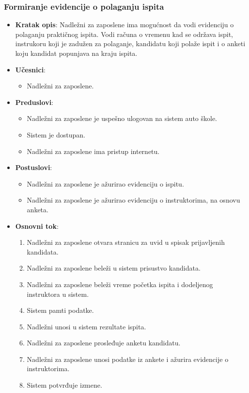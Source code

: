 \subsubsection{Formiranje evidencije o polaganju ispita}
\label{subsubsec:vozni park}
\begin{itemize}
  \item \textbf{Kratak opis}: Nadležni za zaposlene ima mogućnost da vodi evidenciju o polaganju praktičnog ispita. Vodi računa o vremenu kad se održava ispit, instrukoru koji je zadužen za polaganje, kandidatu koji polaže ispit i o anketi koju kandidat popunjava na kraju ispita.

  \item \textbf{Učesnici}:
    \begin{itemize}
    \item Nadležni za zaposlene.
    \end{itemize}
  \item \textbf{Preduslovi}:
    \begin{itemize}
    \item  Nadležni za zaposlene je uspešno ulogovan na sistem auto škole.
    \item  Sistem je dostupan.
    \item  Nadležni za zaposlene ima pristup internetu.
    \end{itemize}
  \item \textbf{Postuslovi}:
      \begin{itemize}
      \item  Nadležni za zaposlene je ažurirao evidenciju o ispitu.
      \item  Nadležni za zaposlene je ažurirao evidenciju o instruktorima, na osnovu anketa.
      \end{itemize}
  \item \textbf{Osnovni tok}:
      \begin{enumerate}
        \item Nadležni za zaposlene otvara stranicu za uvid u spisak prijavljenih kandidata.
        \item Nadležni za zaposlene beleži u sistem prisustvo kandidata.
        \item Nadležni za zaposlene beleži vreme početka ispita i dodeljenog instruktora u sistem.
        \item Sistem pamti podatke.
        \item Nadležni unosi u sistem rezultate ispita.
        \item Nadležni za zaposlene prosleđuje anketu kandidatu.
        \item Nadležni za zaposlene unosi podatke iz ankete i ažurira evidencije o instruktorima.
        \item Sistem potvrđuje izmene.
      \end{enumerate}


\end{itemize}
